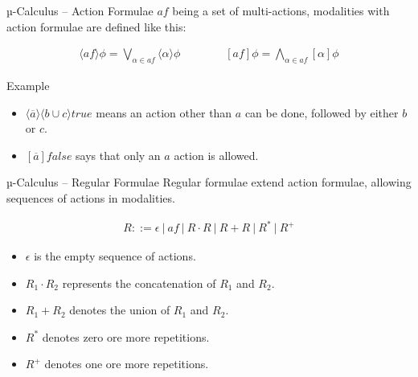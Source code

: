 \documentclass[aspectratio=1610]{beamer}
\begin{document}
  \begin{frame}{µ-Calculus – Action Formulae}
    $\mathit{af}$ being a set of multi-actions, modalities with action formulae are defined like this:

    \begin{align*}
      \langle{\mathit{af}}\rangle\phi = \bigvee_{\alpha \in \mathit{af}} \langle\alpha\rangle\phi
      \qquad\qquad
      [\mathit{af}]\phi = \bigwedge_{\alpha \in \mathit{af}} [\alpha]\phi
    \end{align*}

    \begin{exampleblock}{Example}
      \begin{itemize}
        \item $\langle\overline{a}\rangle\langle{b \cup c}\rangle\mathit{true}$ means an action other than $a$ can be done, followed by either $b$ or $c$.
        \item $[\overline{a}]\mathit{false}$ says that only an $a$ action is allowed.
      \end{itemize}
    \end{exampleblock}
  \end{frame}

  \begin{frame}{µ-Calculus – Regular Formulae}
    Regular formulae extend action formulae, allowing sequences of actions in modalities.

    \begin{align*}
      R ::= \epsilon\ |\ \mathit{af}\ |\ R\cdot{R}\ |\ R+R\ |\ R^*\ |\ R^+
    \end{align*}

    \begin{itemize}
      \item $\epsilon$ is the empty sequence of actions.
      \item $R_1\cdot{R_2}$ represents the concatenation of $R_1$ and $R_2$.
      \item $R_1+R_2$ denotes the union of  $R_1$ and $R_2$.
      \item $R^*$ denotes zero ore more repetitions.
      \item $R^+$ denotes one ore more repetitions.
    \end{itemize}
  \end{frame}
\end{document}
